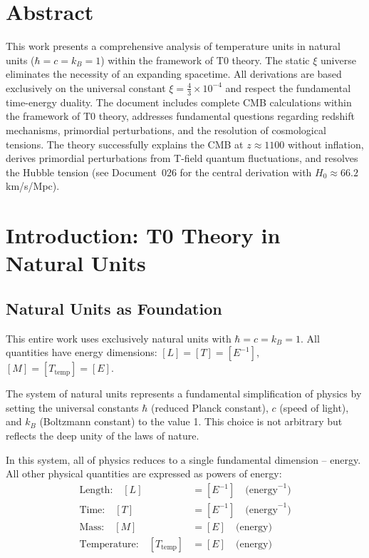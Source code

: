 \section*{Abstract}
		This work presents a comprehensive analysis of temperature units in natural units ($\hbar = c = k_B = 1$) within the framework of T0 theory. The static $\xi$ universe eliminates the necessity of an expanding spacetime. All derivations are based exclusively on the universal constant $\xi = \frac{4}{3} \times 10^{-4}$ and respect the fundamental time-energy duality. The document includes complete CMB calculations within the framework of T0 theory, addresses fundamental questions regarding redshift mechanisms, primordial perturbations, and the resolution of cosmological tensions. The theory successfully explains the CMB at $z \approx 1100$ without inflation, derives primordial perturbations from T-field quantum fluctuations, and resolves the Hubble tension (see Document~026 for the central derivation with $H_0 \approx 66.2\,$km/s/Mpc).

	
	
	\section{Introduction: T0 Theory in Natural Units}
	
	\subsection{Natural Units as Foundation}
	
	\begin{important}
		This entire work uses exclusively natural units with $\hbar = c = k_B = 1$. All quantities have energy dimensions: $[L] = [T] = [E^{-1}]$, $[M] = [T_{\text{temp}}] = [E]$.
	\end{important}
	
	The system of natural units represents a fundamental simplification of physics by setting the universal constants $\hbar$ (reduced Planck constant), $c$ (speed of light), and $k_B$ (Boltzmann constant) to the value 1. This choice is not arbitrary but reflects the deep unity of the laws of nature.
	
	In this system, all of physics reduces to a single fundamental dimension -- energy. All other physical quantities are expressed as powers of energy:
	\begin{align}
		\text{Length:} \quad [L] &= [E^{-1}] \quad \text{(energy}^{-1}\text{)} \\
		\text{Time:} \quad [T] &= [E^{-1}] \quad \text{(energy}^{-1}\text{)} \\
		\text{Mass:} \quad [M] &= [E] \quad \text{(energy)} \\
		\text{Temperature:} \quad [T_{\text{temp}}] &= [E] \quad \text{(energy)}
	\end{align}
	
